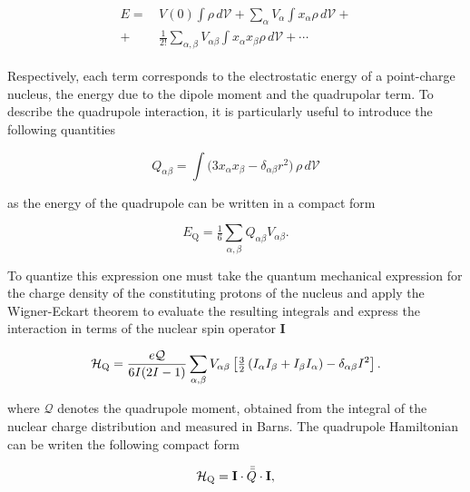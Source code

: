 \begin{align}
\begin{split}
E =&\, V(0) \int \rho \, d\mathcal{V} 
+ \sum_{\alpha} V_{\alpha} \int x_{\alpha} \rho \, d\mathcal{V} +\\
+&\, \frac{1}{2!} \sum_{\alpha,\beta} V_{\alpha \beta} \int x_{\alpha} x_{\beta} \rho \, d\mathcal{V} 
+ \cdots
\end{split}
\end{align}

Respectively, each term corresponds to the electrostatic energy of a point-charge nucleus, the energy due to the dipole moment  and the quadrupolar term. To describe the quadrupole interaction, it is particularly useful to introduce the following quantities 

\begin{equation}
    Q_{\alpha \beta} = \int \big( 3 x_{\alpha} x_{\beta} - \delta_{\alpha \beta} r^{2} \big) \, \rho \, d\mathcal{V}
\end{equation}

as the energy of the quadrupole can be written in a compact form

\begin{equation}
    E_\text{Q} = \tfrac16 \sum_{\alpha, \beta} Q_{\alpha \beta} V_{\alpha \beta}.
\end{equation}

To quantize this expression one must take the quantum mechanical expression for the charge density of the constituting protons of the nucleus and apply the Wigner-Eckart theorem to evaluate the resulting integrals and express the interaction in terms of the nuclear spin operator $\mathbf{I}$ 

\begin{equation}
\mathcal{H}_{\text{Q}} = \frac{e\mathcal{Q}}{6I(2I-1)} 
\sum_{\alpha,\beta} V_{\alpha\beta} 
\left[ \tfrac{3}{2} \left( I_{\alpha} I_{\beta} + I_{\beta} I_{\alpha} \right) 
- \delta_{\alpha\beta} I^{2} \right].
\label{eq:quadrupole}
\end{equation}

where $\mathcal{Q}$ denotes the quadrupole moment, obtained from the integral of the nuclear charge distribution and measured in Barns. The quadrupole Hamiltonian can be writen the following compact form

\begin{equation}
    \mathcal{H}_{\text{Q}} = \mathbf{I} \cdot \bar{\bar{Q}} \cdot \mathbf{I},
\end{equation}

